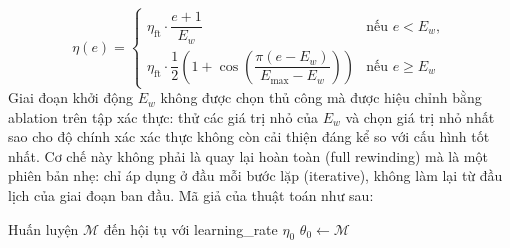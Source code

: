             \begin{equation}
                \eta(e) =
                \begin{cases}
                \eta_{\text{ft}} \cdot \dfrac{e+1}{E_w} & \text{nếu } e < E_w, \\[6pt]
                \eta_{\text{ft}} \cdot \dfrac{1}{2} \left(1 + \cos\left(\dfrac{\pi(e - E_w)}{E_{\text{max}} - E_w}\right)\right) & \text{nếu } e \geq E_w
                \end{cases}
                \label{eq:lr_warmup}
            \end{equation}
            Giai đoạn khởi động $E_w$ không được chọn thủ công mà được hiệu chỉnh bằng ablation trên tập xác thực: thử các giá trị nhỏ của $E_w$ và chọn giá trị nhỏ nhất sao cho độ chính xác xác thực không còn cải thiện đáng kể so với cấu hình tốt nhất. Cơ chế này không phải là quay lại hoàn toàn (full rewinding) mà là một phiên bản nhẹ: chỉ áp dụng ở đầu mỗi bước lặp (iterative), không làm lại từ đầu lịch của giai đoạn ban đầu.
            Mã giả của thuật toán như sau:

\begin{algorithm}[H]
    \caption{Hybrid Pruning Cải tiến -- Giai đoạn 1: Huấn luyện ban đầu}
    \label{alg:hybrid_improved_phase1}
    \DontPrintSemicolon
    \SetAlgoLined
    
    
    Huấn luyện $\mathcal{M}$ đến hội tụ với \gls{learning_rate} $\eta_0$\;
    $\theta_0 \leftarrow \mathcal{M}$
\end{algorithm}

\begin{algorithm}[H] \caption{Hybrid Pruning Cải tiến -- Giai đoạn 2: Lịch học} \label{alg:hybrid_improved_lr_schedule} \DontPrintSemicolon \SetAlgoLined {}   \Return{$\eta$}\; \end{algorithm}

